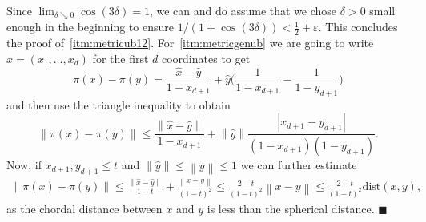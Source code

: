 \documentclass[11pt]{article}%
\newenvironment{proofof}[1]{\vspace{1ex}\noindent{\bf Proof of #1.}}{\hspace*{\fill}$\blacksquare$\vspace{1ex}}
\newcommand{\norm}[1]{\ensuremath{\left\|#1\right\|}}
\newcommand{\eps}{\varepsilon}
\DeclareMathOperator{\dist}{dist}
\newcommand{\dists}{{\mathrm{dist}}}
\begin{document}
\begin{proofof}{Lemma~\ref{lem:metric}}
\noindent 
Since $\lim_{\delta\searrow 0} \cos(3\delta) = 1$, we can and do assume that we chose 
$\delta>0$ small enough in the beginning to ensure $1/(1+\cos(3\delta)) < \frac12+\eps$.
This concludes the proof of~\ref{itm:metricub12}.
\noindent
For~\ref{itm:metricgenub} we are going to write $ \widehat{x}=(x_1,\dots,x_d) $ for the first $ d $ coordinates to get 
	\begin{equation*}
		\pi(x)-\pi(y)=\frac{\widehat{x}-\widehat{y}}{1-x_{d+1}}+\widehat{y}\bigg(\frac{1}{1-x_{d+1}}-\frac{1}{1-y_{d+1}}\bigg)
	\end{equation*}
	and then use the triangle inequality to obtain
	\begin{equation*}
		\norm{\pi(x)-\pi(y)}\leq \frac{\norm{\widehat{x}-\widehat{y}}}{1-x_{d+1}}+\norm{\widehat{y}}\frac{|x_{d+1}-y_{d+1}|}{(1-x_{d+1})(1-y_{d+1})}.
	\end{equation*}
Now, if $  x_{d+1},y_{d+1}\leq t $ and $ \norm{\widehat{y}}\leq \norm{y}\leq 1 $ we can further estimate
\begin{equation*}
	\begin{split}
		\norm{\pi(x)-\pi(y)}\leq \frac{\norm{\widehat{x}-\widehat{y}}}{1-t}+\frac{\norm{x-y}}{(1-t)^2}\leq \frac{2-t}{(1-t)^2}\norm{x-y}\leq \frac{2-t}{(1-t)^2}\dists(x,y),
	\end{split}
\end{equation*}
as the chordal distance between $ x $ and $ y $ is less than the spherical distance.
\end{proofof}
% 
% 
% 
\end{document}
